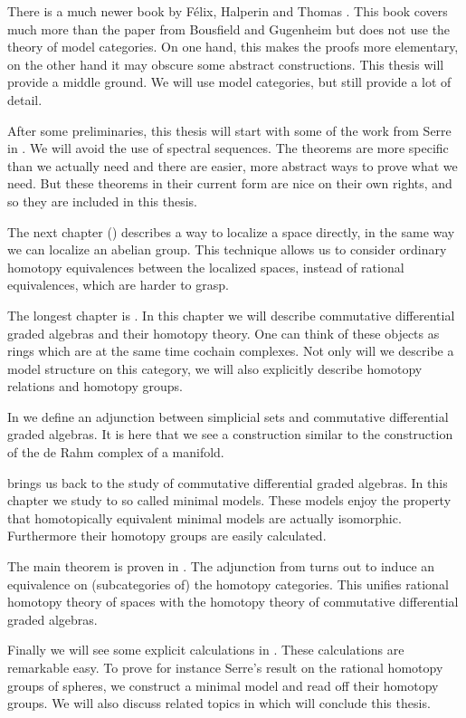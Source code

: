 There is a much newer book by Félix, Halperin and Thomas \cite{felix}. This book covers much more than the paper from Bousfield and Gugenheim but does not use the theory of model categories. On one hand, this makes the proofs more elementary, on the other hand it may obscure some abstract constructions. This thesis will provide a middle ground. We will use model categories, but still provide a lot of detail.

After some preliminaries, this thesis will start with some of the work from Serre in . We will avoid the use of spectral sequences. The theorems are more specific than we actually need and there are easier, more abstract ways to prove what we need. But these theorems in their current form are nice on their own rights, and so they are included in this thesis.

The next chapter () describes a way to localize a space directly, in the same way we can localize an abelian group. This technique allows us to consider ordinary homotopy equivalences between the localized spaces, instead of rational equivalences, which are harder to grasp.

The longest chapter is . In this chapter we will describe commutative differential graded algebras and their homotopy theory. One can think of these objects as rings which are at the same time cochain complexes. Not only will we describe a model structure on this category, we will also explicitly describe homotopy relations and homotopy groups.

In  we define an adjunction between simplicial sets and commutative differential graded algebras. It is here that we see a construction similar to the construction of the de Rahm complex of a manifold.

 brings us back to the study of commutative differential graded algebras. In this chapter we study to so called minimal models. These models enjoy the property that homotopically equivalent minimal models are actually isomorphic. Furthermore their homotopy groups are easily calculated.

The main theorem is proven in . The adjunction from  turns out to induce an equivalence on (subcategories of) the homotopy categories. This unifies rational homotopy theory of spaces with the homotopy theory of commutative differential graded algebras.

Finally we will see some explicit calculations in . These calculations are remarkable easy. To prove for instance Serre's result on the rational homotopy groups of spheres, we construct a minimal model and read off their homotopy groups. We will also discuss related topics in  which will conclude this thesis.


